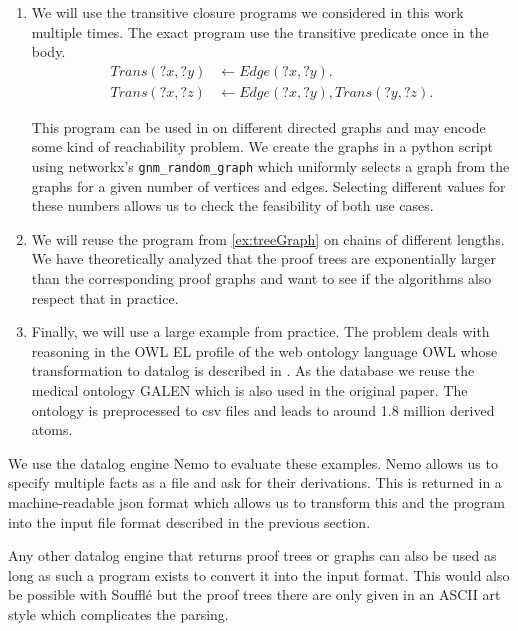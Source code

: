 \begin{enumerate}
    \item We will use the transitive closure programs we considered in this work multiple times. The exact program use the transitive predicate once in the body.
    \begin{equation}
        \begin{split}
            Trans(?x, ?y) &\leftarrow Edge(?x, ?y). \\
            Trans(?x, ?z) &\leftarrow Edge(?x, ?y),  Trans(?y, ?z). 
        \end{split}
    \end{equation}

    This program can be used in on different directed graphs and may encode some kind of reachability problem. We create the graphs in a python script using networkx's \lstinline|gnm_random_graph| which uniformly selects a graph from the graphs for a given number of vertices and edges. Selecting different values for these numbers allows us to check the feasibility of both use cases.

    \item We will reuse the program from \cref{ex:treeGraph} on chains of different lengths. We have theoretically analyzed that the proof trees are exponentially larger than the corresponding proof graphs and want to see if the algorithms also respect that in practice.
    
    \item Finally, we will use a large example from practice. The problem deals with reasoning in the OWL EL profile of the web ontology language OWL whose transformation to datalog is described in \cite{ELK}. As the database we reuse the medical ontology GALEN which is also used in the original paper. The ontology is preprocessed to csv files and leads to around 1.8 million derived atoms.
\end{enumerate}

We use the datalog engine Nemo\cite{Nemo} to evaluate these examples. Nemo allows us to specify multiple facts as a file and ask for their derivations. This is returned in a machine-readable json format which allows us to transform this and the program into the input file format described in the previous section.

Any other datalog engine that returns proof trees or graphs can also be used as long as such a program exists to convert it into the input format. This would also be possible with Soufflé\cite{Souffle} but the proof trees there are only given in an ASCII art style which complicates the parsing.

